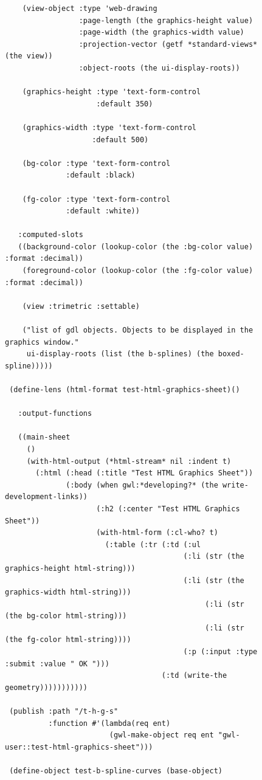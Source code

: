 \documentclass [11pt]{book}
\begin{document}
\begin{itemize}
\begin{figure}
\begin{lrbox}{\boxedverb}
\begin{minipage}{\linewidth}
{\begin{verbatim}
    (view-object :type 'web-drawing
                 :page-length (the graphics-height value)
                 :page-width (the graphics-width value)
                 :projection-vector (getf *standard-views* (the view))
                 :object-roots (the ui-display-roots))
   
    (graphics-height :type 'text-form-control
                     :default 350)
   
    (graphics-width :type 'text-form-control
                    :default 500)
   
    (bg-color :type 'text-form-control
              :default :black)
   
    (fg-color :type 'text-form-control
              :default :white))
     
   :computed-slots
   ((background-color (lookup-color (the :bg-color value) :format :decimal))
    (foreground-color (lookup-color (the :fg-color value) :format :decimal))
     
    (view :trimetric :settable)
   
    ("list of gdl objects. Objects to be displayed in the graphics window."
     ui-display-roots (list (the b-splines) (the boxed-spline)))))

 (define-lens (html-format test-html-graphics-sheet)()
   
   :output-functions

   ((main-sheet
     ()
     (with-html-output (*html-stream* nil :indent t)
       (:html (:head (:title "Test HTML Graphics Sheet"))
              (:body (when gwl:*developing?* (the write-development-links))
                     (:h2 (:center "Test HTML Graphics Sheet"))
                     (with-html-form (:cl-who? t)
                       (:table (:tr (:td (:ul 
                                         (:li (str (the graphics-height html-string)))
                                         (:li (str (the graphics-width html-string)))
                                              (:li (str (the bg-color html-string)))
                                              (:li (str (the fg-color html-string))))
                                         (:p (:input :type :submit :value " OK ")))
                                    (:td (write-the geometry)))))))))))

 (publish :path "/t-h-g-s"
          :function #'(lambda(req ent)
                        (gwl-make-object req ent "gwl-user::test-html-graphics-sheet")))

 (define-object test-b-spline-curves (base-object)


\end{verbatim}}
\end{minipage}
\end{lrbox}
\end{figure}
\end{itemize}
\end{document}
